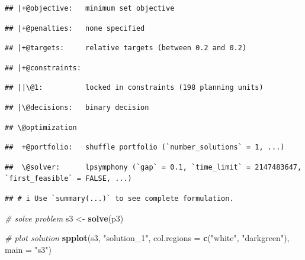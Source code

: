 \documentclass[12pt,]{book}
\newenvironment{Shaded}{\begin{snugshade}}{\end{snugshade}}
\newcommand{\CommentTok}[1]{\textcolor[rgb]{0.56,0.35,0.01}{\textit{#1}}}
\newcommand{\DataTypeTok}[1]{\textcolor[rgb]{0.13,0.29,0.53}{#1}}
\newcommand{\KeywordTok}[1]{\textcolor[rgb]{0.13,0.29,0.53}{\textbf{#1}}}
\newcommand{\NormalTok}[1]{#1}
\newcommand{\StringTok}[1]{\textcolor[rgb]{0.31,0.60,0.02}{#1}}
\begin{document}
\begin{verbatim}
## |+@objective:   minimum set objective
\end{verbatim}

\begin{verbatim}
## |+@penalties:   none specified
\end{verbatim}

\begin{verbatim}
## |+@targets:     relative targets (between 0.2 and 0.2)
\end{verbatim}

\begin{verbatim}
## |+@constraints:
\end{verbatim}

\begin{verbatim}
## ||\@1:          locked in constraints (198 planning units)
\end{verbatim}

\begin{verbatim}
## |\@decisions:   binary decision
\end{verbatim}

\begin{verbatim}
## \@optimization
\end{verbatim}

\begin{verbatim}
##  +@portfolio:   shuffle portfolio (`number_solutions` = 1, ...)
\end{verbatim}

\begin{verbatim}
##  \@solver:      lpsymphony (`gap` = 0.1, `time_limit` = 2147483647, `first_feasible` = FALSE, ...)
\end{verbatim}

\begin{verbatim}
## # i Use `summary(...)` to see complete formulation.
\end{verbatim}

\begin{Shaded}
\begin{Highlighting}[]
\CommentTok{# solve problem}
\NormalTok{s3 <-}\StringTok{ }\KeywordTok{solve}\NormalTok{(p3)}

\CommentTok{# plot solution}
\KeywordTok{spplot}\NormalTok{(s3, }\StringTok{"solution_1"}\NormalTok{, }\DataTypeTok{col.regions =} \KeywordTok{c}\NormalTok{(}\StringTok{"white"}\NormalTok{, }\StringTok{"darkgreen"}\NormalTok{), }\DataTypeTok{main =} \StringTok{"s3"}\NormalTok{)}
\end{Highlighting}
\end{Shaded}
\end{document}

